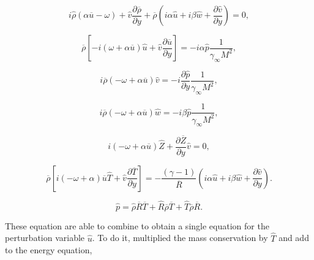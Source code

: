 \begin{equation}
i
\hat{\rho}
(\alpha\overline{u}- \omega) 
+
\hat{v}
\frac{\partial \overline{\rho}}{\partial y} 
+
\overline{\rho}
\left(
i
\alpha
\hat{u}
+
i
\beta
\hat{w}
+
\frac{\partial \hat{v}}{\partial y}
\right)
=
0
,
\end{equation} 


\begin{equation} 
\overline{\rho}
\left[
-
i
\left(
\omega 
+
\alpha 
\overline{u}
\right)
\hat{u}
+
\hat{v}
\frac{\partial\overline{u}}{\partial y}
\right]
=
-
i
\alpha\hat{p}
\frac{1}{\gamma_{\infty} M^{2}}
,
\end{equation} 

\begin{equation} 
i
\overline{\rho}
\left(
-
\omega 
+
\alpha 
\overline{u}
\right)
\hat{v}
=
-
i
\frac{\partial \hat{p}}{\partial y}
\frac{1}{\gamma_{\infty} M^{2}}
,
\end{equation} 

\begin{equation} 
i
\overline{\rho}
\left(
-
\omega 
+
\alpha 
\overline{u}
\right)
\hat{w}
=
-
i
\beta\hat{p}
\frac{1}{\gamma_{\infty} M^{2}}
,
\end{equation} 

\begin{equation} 
i
\left(
-
\omega 
+
\alpha 
\overline{u}
\right)
\hat{Z}
+
\frac{\partial \overline{Z}}{\partial y}
\hat{v}
=
0
,
\end{equation} 

\begin{equation} 
\overline{\rho}
\left[
    i
    \left(
    -
    \omega 
    +
    \alpha 
    \right)
    \overline{u}
    \hat{T}
    +
    \hat{v}
    \frac{\partial \overline{T} }{\partial y}
\right]
=
-
\frac{(\gamma-1)}{\overline{R}}
\left(
i
\alpha
\hat{u}
+
i
\beta
\hat{w}
+
\frac{\partial \hat{v}}{\partial y}
\right)
.
\end{equation} 

\begin{equation*}
   \hat{p}
   = 
   \hat{\rho}
   \overline{R}
   \overline{T}
   +
   \hat{R}
   \overline{\rho}
   \overline{T}
   +
   \hat{T}
   \overline{\rho}
   \overline{R}
   .
\end{equation*}

These equation are able to combine to obtain a single equation 
for the perturbation variable $\hat{u}$. 
To do it,  multiplied the mass conservation by $\hat{T}$ and add  to the 
energy equation, 

